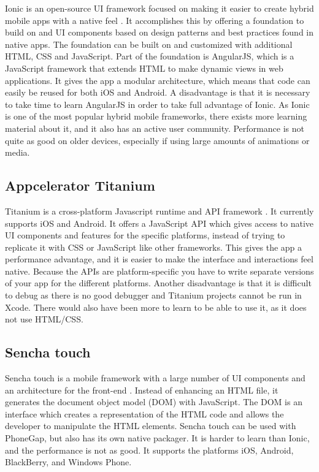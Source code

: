 Ionic is an open-source UI framework focused on making it easier to create hybrid mobile apps with a native feel \cite{RA1}. It accomplishes this by offering a foundation to build on and UI components based on design patterns and best practices found in native apps. The foundation can be built on and customized with additional HTML, CSS and JavaScript. Part of the foundation is AngularJS, which is a JavaScript framework that extends HTML to make dynamic views in web applications. It gives the app a modular architecture, which means that code can easily be reused for both iOS and Android. A disadvantage is that it is necessary to take time to learn AngularJS in order to take full advantage of Ionic. As Ionic is one of the most popular hybrid mobile frameworks, there exists more learning material about it, and it also has an active user community. Performance is not quite as good on older devices, especially if using large amounts of animations or media.

\subsection{Appcelerator Titanium}

Titanium is a cross-platform Javascript runtime and API framework \cite{RA3}. It currently supports iOS and Android. It offers a JavaScript API which gives access to native UI components and features for the specific platforms, instead of trying to replicate it with CSS or JavaScript like other frameworks. This gives the app a performance advantage, and it is easier to make the interface and interactions feel native. Because the APIs are platform-specific you have to write separate versions of your app for the different platforms. Another disadvantage is that it is difficult to debug as there is no good debugger and Titanium projects cannot be run in Xcode. There would also have been more to learn to be able to use it, as it does not use HTML/CSS.

\subsection{Sencha touch}

Sencha touch is a mobile framework with a large number of UI components and an architecture for the front-end \cite{RA4}. Instead of enhancing an HTML file, it generates the document object model (DOM) with JavaScript. The DOM is an interface which creates a representation of the HTML code and allows the developer to manipulate the HTML elements. Sencha touch can be used with PhoneGap, but also has its own native packager. It is harder to learn than Ionic, and the performance is not as good.  It supports the platforms iOS, Android, BlackBerry, and Windows Phone.

